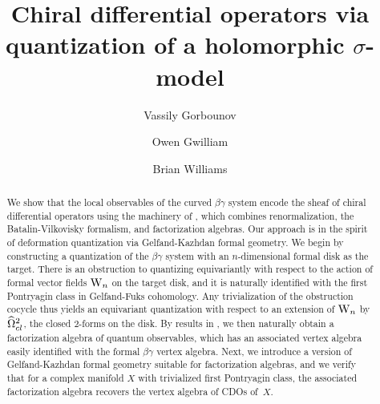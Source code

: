 \documentclass[10pt,oneside]{amsart}
\title{Chiral differential operators via\\quantization of a holomorphic $\sigma$-model}
\author{Vassily Gorbounov}
\author{Owen Gwilliam}
\author{Brian Williams}
\begin{document}
\maketitle

\begin{abstract}
We show that the local observables of the curved $\beta\gamma$ system
encode the sheaf of chiral differential operators using the machinery of \cite{CG}, 
which combines renormalization, the Batalin-Vilkovisky formalism, and factorization algebras. 
Our approach is in the spirit of deformation quantization via Gelfand-Kazhdan formal geometry.
We begin by constructing a quantization of the $\beta\gamma$ system with an $n$-dimensional formal disk as the target. There is an obstruction to quantizing equivariantly with respect to the action of formal vector fields ${{\rm W}_n}$ on the target disk, and it is naturally identified with the first Pontryagin class in Gelfand-Fuks cohomology.
Any trivialization of the obstruction cocycle thus yields an equivariant quantization with respect to an extension of ${{\rm W}_n}$ by $\widehat{\Omega}^2_{cl}$, the closed 2-forms on the disk. By results in \cite{CG}, we then naturally obtain a factorization algebra of quantum observables, which has an associated vertex algebra easily identified with the formal $\beta\gamma$ vertex algebra. Next, we introduce a version of Gelfand-Kazhdan formal geometry suitable for factorization algebras, and we verify that for a complex manifold $X$ with trivialized first Pontryagin class, the associated factorization algebra recovers the vertex algebra of CDOs of~$X$.\\
\end{abstract}


\tableofcontents







\end{document}
